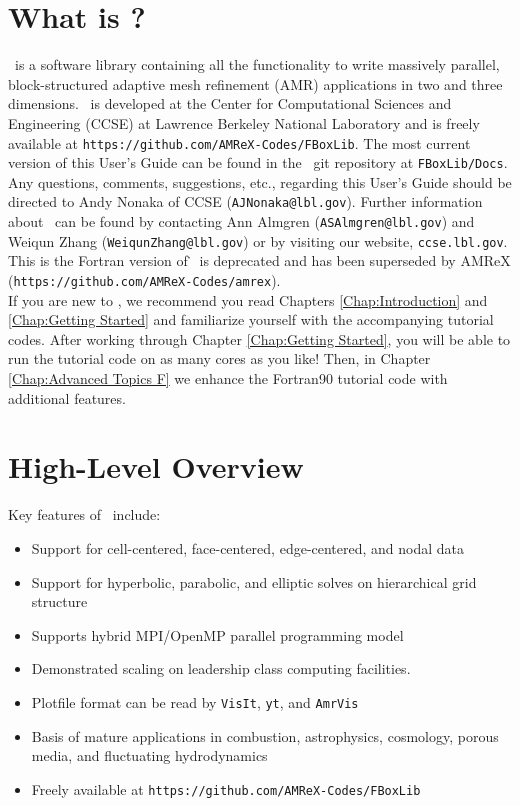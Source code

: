 \section{What is \FBoxLib?}

\FBoxLib\ is a software library containing all the functionality 
to write massively parallel, 
block-structured adaptive mesh refinement (AMR) applications in two and three dimensions.
\FBoxLib\ is developed at the Center for Computational Sciences and Engineering (CCSE) at 
Lawrence Berkeley National Laboratory and is freely available
at {\tt https://github.com/AMReX-Codes/FBoxLib}.
The most current version of this User's Guide
can be found in the \FBoxLib\ git repository at {\tt FBoxLib/Docs}.  Any questions,
comments, suggestions, etc., regarding this User's Guide should be directed
to Andy Nonaka of CCSE ({\tt AJNonaka@lbl.gov}).  Further information 
about \FBoxLib\ can be found by contacting Ann Almgren
({\tt ASAlmgren@lbl.gov}) and Weiqun Zhang ({\tt WeiqunZhang@lbl.gov})
or by visiting our website, {\tt ccse.lbl.gov}.\\ 

\noindent This is the Fortran version of \BoxLib\.  \FBoxLib\ is deprecated and has
been superseded by AMReX ({\tt https://github.com/AMReX-Codes/amrex}).\\ 

If you are new to \FBoxLib, we recommend you read Chapters \ref{Chap:Introduction} and
\ref{Chap:Getting Started} and familiarize yourself with the accompanying tutorial codes.
After working through Chapter \ref{Chap:Getting Started}, you will be able to run the tutorial
code on as many cores as you like!  Then, in Chapter \ref{Chap:Advanced Topics F} we enhance 
the Fortran90 tutorial code with additional features.

\section{High-Level Overview}

Key features of \FBoxLib\ include:
\begin{itemize}
\item Support for cell-centered, face-centered, edge-centered, and nodal data
\item Support for hyperbolic, parabolic, and elliptic solves on hierarchical grid structure
\item Supports hybrid MPI/OpenMP parallel programming model
\item Demonstrated scaling on leadership class computing facilities.
\item Plotfile format can be read by {\tt VisIt}, {\tt yt}, and {\tt AmrVis}
\item Basis of mature applications in combustion, astrophysics, cosmology, porous media, 
      and fluctuating hydrodynamics
\item Freely available at {\tt https://github.com/AMReX-Codes/FBoxLib}
\end{itemize}

